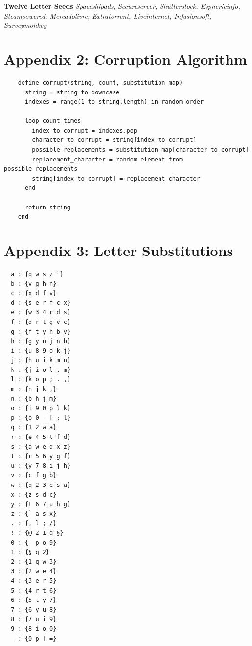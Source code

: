 \documentclass{csfourzero}
\begin{document}
\noindent
\textbf{Twelve Letter Seeds}
\textit{{Spaceshipads, Secureserver, Shutterstock, Espncricinfo, Steampowered, Mercadolivre, Extratorrent, Liveinternet, Infusionsoft, Surveymonkey}}

\pagebreak
\raggedbottom
\section{Appendix 2: Corruption Algorithm}
  \begin{verbatim}
    define corrupt(string, count, substitution_map)
      string = string to downcase
      indexes = range(1 to string.length) in random order

      loop count times
        index_to_corrupt = indexes.pop
        character_to_corrupt = string[index_to_corrupt]
        possible_replacements = substitution_map[character_to_corrupt]
        replacement_character = random element from possible_replacements
        string[index_to_corrupt] = replacement_character
      end

      return string
    end
  \end{verbatim}

\pagebreak
\section{Appendix 3: Letter Substitutions}
\begin{multicols}{2}
  \begin{verbatim}
  a : {q w s z `}
  b : {v g h n}
  c : {x d f v}
  d : {s e r f c x}
  e : {w 3 4 r d s}
  f : {d r t g v c}
  g : {f t y h b v}
  h : {g y u j n b}
  i : {u 8 9 o k j}
  j : {h u i k m n}
  k : {j i o l , m}
  l : {k o p ; . ,}
  m : {n j k ,}
  n : {b h j m}
  o : {i 9 0 p l k}
  p : {o 0 - [ ; l}
  q : {1 2 w a}
  r : {e 4 5 t f d}
  s : {a w e d x z}
  t : {r 5 6 y g f}
  u : {y 7 8 i j h}
  v : {c f g b}
  w : {q 2 3 e s a}
  x : {z s d c}
  y : {t 6 7 u h g}
  z : {` a s x}
  . : {, l ; /}
  ! : {@ 2 1 q §}
  0 : {- p o 9}
  1 : {§ q 2}
  2 : {1 q w 3}
  3 : {2 w e 4}
  4 : {3 e r 5}
  5 : {4 r t 6}
  6 : {5 t y 7}
  7 : {6 y u 8}
  8 : {7 u i 9}
  9 : {8 i o 0}
  - : {0 p [ =}
  \end{verbatim}
\end{multicols}
\end{document}
